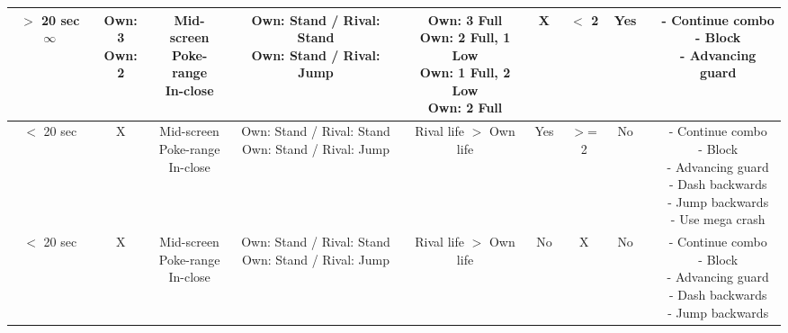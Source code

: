 \documentclass{article}
\begin{document}
\begin{landscape}
\begin{table}[h!]
\begin{center}
\begin{tabular*}{27cm}{c|c|c|c|c|c|c|c|c|c}
      \makecell{$>$ 20 sec \\ $\infty$} & \makecell {Own: 3 \\ Own: 2} & \makecell{Mid-screen \\ Poke-range\\ In-close} & \makecell{Own: Stand / Rival: Stand \\ Own: Stand / Rival: Jump} & \makecell {Own: 3 Full \\ Own: 2 Full, 1 Low \\ Own: 1 Full, 2 Low \\ Own: 2 Full} & X & $<$ 2 & Yes & & \makecell{- Continue combo \\ - Block \\ - Advancing guard}\\
      \hline
      $<$ 20 sec & X & \makecell{Mid-screen \\ Poke-range\\ In-close} & \makecell{Own: Stand / Rival: Stand \\ Own: Stand / Rival: Jump} & Rival life $>$ Own life & Yes & $>$= 2 & No & & \makecell{- Continue combo \\ - Block \\ - Advancing guard \\ - Dash backwards \\ - Jump backwards \\ - Use mega crash}\\
      \hline
      $<$ 20 sec & X & \makecell{Mid-screen \\ Poke-range\\ In-close} & \makecell{Own: Stand / Rival: Stand \\ Own: Stand / Rival: Jump} & Rival life $>$ Own life & No & X & No & & \makecell{- Continue combo \\ - Block \\ - Advancing guard \\ - Dash backwards \\ - Jump backwards}\\
      \hline
  \end{tabular*}
  \end{center}
\end{table}

\end{landscape}

\newpage
\end{document}
